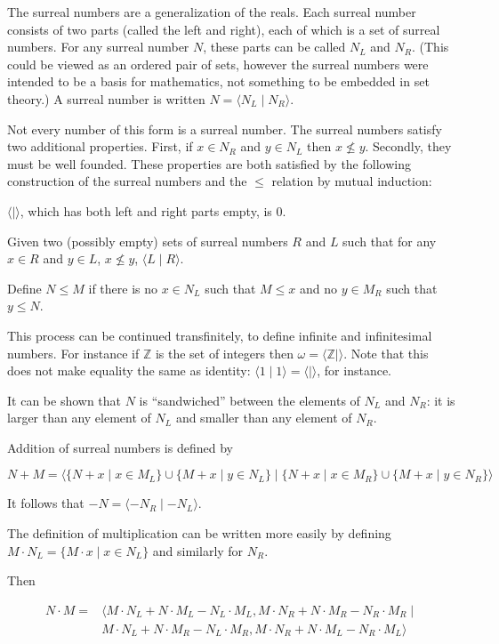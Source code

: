\documentclass[12pt]{article}
\begin{document}
The surreal numbers are a generalization of the reals.  Each surreal number consists of two parts (called the left and right), each of which is a set of surreal numbers.  For any surreal number $N$, these parts can be called $N_L$ and $N_R$.  (This could be viewed as an ordered pair of sets, however the surreal numbers were intended to be a basis for mathematics, not something to be embedded in set theory.)  A surreal number is written $N=\langle N_L\mid N_R\rangle$.

Not every number of this form is a surreal number.  The surreal numbers satisfy two additional properties.  First, if $x\in N_R$ and $y\in N_L$ then $x\nleq y$.  Secondly, they must be well founded.  These properties are both satisfied by the following construction of the surreal numbers and the $\leq$ relation by mutual induction:

$\langle\mid\rangle$, which has both left and right parts empty, is $0$.

Given two (possibly empty) sets of surreal numbers $R$ and $L$ such that for any $x\in R$ and $y\in L$, $x\nleq y$, $\langle L\mid R\rangle$.

Define $N\leq M$ if there is no $x\in N_L$ such that $M\leq x$ and no $y\in M_R$ such that $y\leq N$.

This process can be continued transfinitely, to define infinite and infinitesimal numbers.  For instance if $\mathbb{Z}$ is the set of integers then $\omega=\langle \mathbb{Z}\mid \rangle$.  Note that this does not make equality the same as identity: $\langle 1\mid 1\rangle=\langle \mid\rangle$, for instance.

It can be shown that $N$ is ``sandwiched'' between the elements of $N_L$ and $N_R$: it is larger than any element of $N_L$ and smaller than any element of $N_R$.

Addition of surreal numbers is defined by 

$$N+M=\langle \{N+x\mid x\in M_L\}\cup\{M+x\mid y\in N_L\}\mid \{N+x\mid x\in M_R\}\cup\{M+x\mid y\in N_R\}\rangle$$

It follows that $-N=\langle -N_R\mid -N_L\rangle$.

The definition of multiplication can be written more easily by defining $M\cdot  N_L=\{M\cdot x\mid x\in N_L\}$ and similarly for $N_R$.

Then

\begin{align*}
N\cdot M=&\langle M\cdot N_L+N\cdot M_L-N_L\cdot M_L,M\cdot N_R+N\cdot M_R-N_R\cdot M_R\mid \\
&M\cdot N_L+N\cdot M_R-N_L\cdot M_R,M\cdot N_R+N\cdot M_L-N_R\cdot M_L\rangle
\end{align*}
\end{document}
